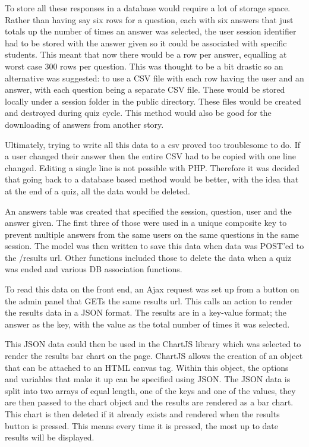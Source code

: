 To store all these responses in a database would require a lot of storage space. Rather than having say six rows for a question, each with six answers that just totals up the number of times an answer was selected, the user session identifier had to be stored with the answer given so it could be associated with specific students. This meant that now there would be a row per answer, equalling at worst case 300 rows per question. This was thought to be a bit drastic so an alternative was suggested: to use a CSV file with each row having the user and an answer, with each question being a separate CSV file. These would be stored locally under a session folder in the public directory. These files would be created and destroyed during quiz cycle. This method would also be good for the downloading of answers from another story. 

Ultimately, trying to write all this data to a csv proved too troublesome to do. If a user changed their answer then the entire CSV had to be copied with one line changed. Editing a single line is not possible with PHP. Therefore it was decided that going back to a database based method would be better, with the idea that at the end of a quiz, all the data would be deleted.

An answers table was created that specified the session, question, user and the answer given. The first three of those were used in a unique composite key to prevent multiple answers from the same users on the same questions in the same session. The model was then written to save this data when data was POST'ed to the /results url. Other functions included those to delete the data when a quiz was ended and various DB association functions.

To read this data on the front end, an Ajax request was set up from a button on the admin panel that GETs the same results url. This calls an action to render the results data in a JSON format. The results are in a key-value format; the answer as the key, with the value as the total number of times it was selected.

This JSON data could then be used in the ChartJS library which was selected to render the results bar chart on the page\cite{chartjs}. ChartJS allows the creation of an object that can be attached to an HTML canvas tag. Within this object, the options and variables that make it up can be specified using JSON. The JSON data is split into two arrays of equal length, one of the keys and one of the values, they are then passed to the chart object and the results are rendered as a bar chart. This chart is then deleted if it already exists and rendered when the results button is pressed. This means every time it is pressed, the most up to date results will be displayed. 
